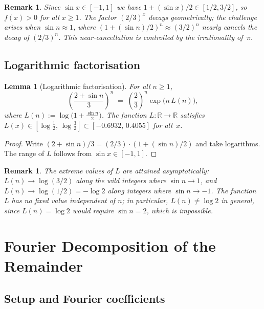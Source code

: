 \documentclass[12pt]{amsart}
\newtheorem{lemma}[theorem]{Lemma}
\newtheorem{remark}[theorem]{Remark}
\newcommand{\R}{\mathbb{R}}
\begin{document}
\begin{remark}
Since $\sin x\in[-1,1]$ we have $1+(\sin x)/2\in[1/2,3/2]$, so
$f(x)>0$ for all $x\ge 1$.  The factor $(2/3)^x$ decays geometrically;
the challenge arises when $\sin n\approx 1$, where
$(1+(\sin n)/2)^n\approx (3/2)^n$ nearly cancels the decay of
$(2/3)^n$.  This near-cancellation is controlled by the irrationality
of~$\pi$.
\end{remark}

\subsection{Logarithmic factorisation}

\begin{lemma}[Logarithmic factorisation]\label{lem:log-factor}
For all $n\ge 1$,
\[
  \left(\frac{2+\sin n}{3}\right)^{\!n}
  \;=\; \left(\frac{2}{3}\right)^{\!n}
        \exp\!\bigl(n\,L(n)\bigr),
\]
where $L(n):=\log\!\bigl(1+\tfrac{\sin n}{2}\bigr)$.
The function $L\colon\R\to\R$ satisfies
$L(x)\in[\log\tfrac{1}{2},\,\log\tfrac{3}{2}]\subset[-0.6932,\,0.4055]$
for all~$x$.
\end{lemma}

\begin{proof}
Write $(2+\sin n)/3=(2/3)\cdot(1+(\sin n)/2)$ and take logarithms.
The range of $L$ follows from $\sin x\in[-1,1]$.
\end{proof}

\begin{remark}\label{rem:L-values}
The extreme values of $L$ are attained asymptotically:
$L(n)\to\log(3/2)$ along the wild integers where $\sin n\to 1$, and
$L(n)\to\log(1/2)=-\log 2$ along integers where $\sin n\to -1$.
The function $L$ has no fixed value independent of $n$; in particular,
$L(n)\ne\log 2$ in general, since $L(n)=\log 2$ would require
$\sin n=2$, which is impossible.
\end{remark}

\section{Fourier Decomposition of the Remainder}

\subsection{Setup and Fourier coefficients}
\end{document}
